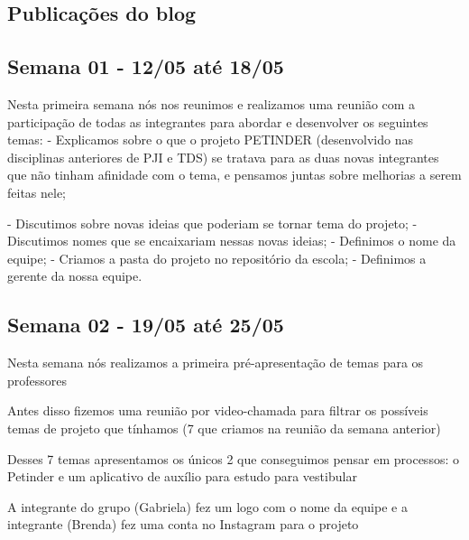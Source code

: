 \begin{apendicesenv}

\chapter{Publicações do blog}
\label{publicacoes-blog}
\begin{flushleft} %
    \section{Semana 01 - 12/05 até 18/05}


Nesta primeira semana nós nos reunimos e realizamos uma reunião com a participação de todas as integrantes para abordar e desenvolver os seguintes temas:
 \newline
- Explicamos sobre o que o projeto PETINDER (desenvolvido nas disciplinas anteriores de \ac{PJI} e \ac{TDS}) se tratava para as duas novas integrantes que não tinham afinidade com o tema, e pensamos juntas sobre melhorias a serem feitas nele;
 \newline
 
- Discutimos sobre novas ideias que poderiam se tornar tema do projeto;
  \newline
- Discutimos nomes que se encaixariam nessas novas ideias;
  \newline
- Definimos o nome da equipe;
  \newline
- Criamos a pasta do projeto no repositório da escola;
  \newline
- Definimos a gerente da nossa equipe.
\newline
\end{flushleft}
\begin{flushleft}
 \section{Semana 02 - 19/05 até 25/05}
 Nesta semana nós realizamos a primeira pré-apresentação de temas para os professores 

Antes disso fizemos uma reunião por video-chamada para filtrar os possíveis temas de projeto que tínhamos (7 que criamos na reunião da semana anterior)

Desses 7 temas apresentamos os únicos 2 que conseguimos pensar em processos: o Petinder e um aplicativo de auxílio para  estudo para vestibular

A integrante do grupo (Gabriela) fez um logo com o nome da equipe e a integrante (Brenda) fez uma conta no \gls{Instagram} para o projeto


\end{flushleft}
\end{apendicesenv}
